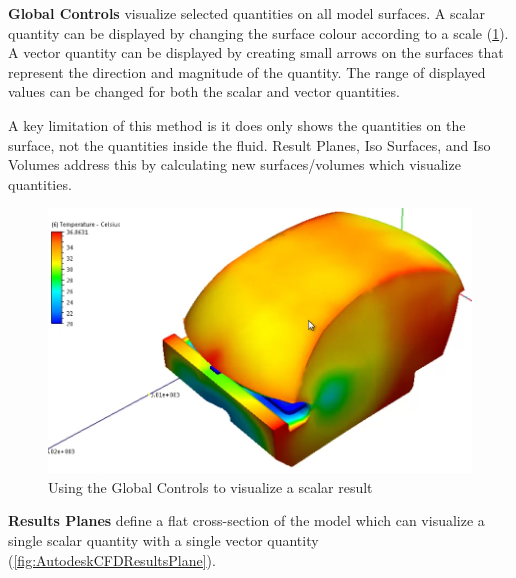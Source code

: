\textbf{Global Controls}\cite[Global Controls]{AutodeskCFDManual} visualize selected quantities on all model surfaces.
A scalar quantity can be displayed by changing the surface colour according to a scale (\cref{fig:AutodeskCFDGlobalControlsScalar}).
A vector quantity can be displayed by creating small arrows on the surfaces that represent the direction and magnitude of the quantity.
The range of displayed values can be changed for both the scalar and vector quantities.

A key limitation of this method is it does only shows the quantities on the surface, not the quantities inside the fluid.
Result Planes, Iso Surfaces, and Iso Volumes address this by calculating new surfaces/volumes which visualize quantities.

\begin{figure}
    \centering
    \includegraphics[width=\linewidth]{Ch20Research/figures/autodesk_cfd_global_results_scalar.PNG}
    \caption{Using the Global Controls to visualize a scalar result\cite{AutodeskCFDExercise7}}
    \label{fig:AutodeskCFDGlobalControlsScalar}
\end{figure}

\textbf{Results Planes}\cite[Planes]{AutodeskCFDManual} define a flat cross-section of the model which can visualize a single scalar quantity with a single vector quantity (\cref{fig:AutodeskCFDResultsPlane}).

